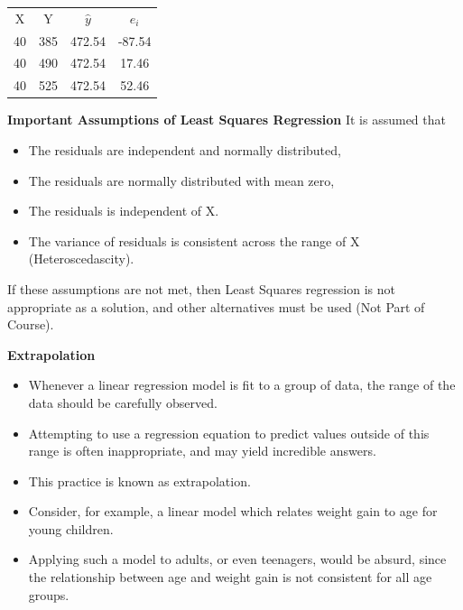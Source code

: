 \documentclass[]{report}
\begin{document}
	

	
	\begin{center}
		\begin{tabular}{|c|c|c|c|}
			\hline
			X & Y& $\hat{y}$ & $e_i$ \\
			40 &385 &472.54 &-87.54\\
			40 &490 &472.54 & 17.46\\
			40 &525 &472.54 & 52.46\\
			\hline
		\end{tabular}
	\end{center}
	
	
	
	\textbf{Important Assumptions of Least Squares Regression}
	It is assumed that
	\begin{itemize}
		\item The residuals are independent and normally distributed,
		\item The residuals are normally distributed with mean zero,
		\item The residuals is independent of X.
		\item The variance of residuals is consistent across the range of X (Heteroscedascity).
	\end{itemize}
	If these assumptions are not met, then Least Squares regression is not appropriate as a solution, and other alternatives must be used (Not Part of Course).
	
	
	\textbf{Extrapolation}
	\begin{itemize}
		\item
		Whenever a linear regression model is fit to a group of data, the range of the data should be carefully observed. \item  Attempting to use a regression equation to predict values outside of this range is often inappropriate, and may yield incredible answers. \item This practice is known as extrapolation. \item Consider, for example, a linear model which relates weight gain to age for young children. \item Applying such a model to adults, or even teenagers, would be absurd, since the relationship between age and weight gain is not consistent for all age groups.
	\end{itemize}
	
\end{document}
